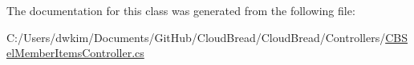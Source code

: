 The documentation for this class was generated from the following file\+:\begin{DoxyCompactItemize}
\item 
C\+:/\+Users/dwkim/\+Documents/\+Git\+Hub/\+Cloud\+Bread/\+Cloud\+Bread/\+Controllers/\hyperlink{a00224}{C\+B\+Sel\+Member\+Items\+Controller.\+cs}\end{DoxyCompactItemize}
